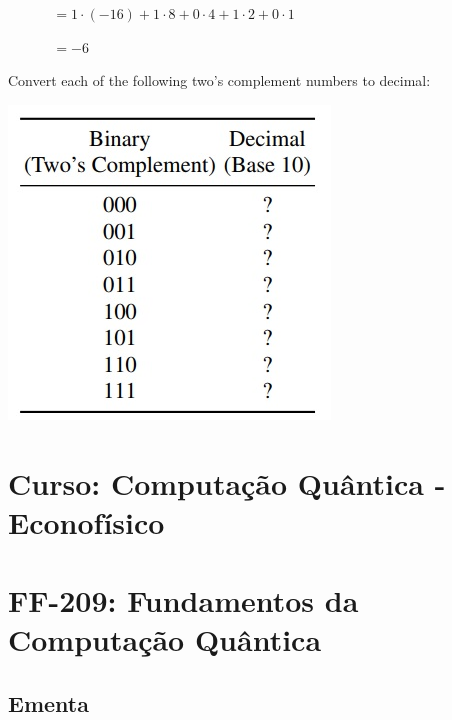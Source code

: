 \documentclass[12pt]{article}
\begin{document}
\(\quad\quad\quad\,= 1 \cdot (-16) + 1 \cdot 8 + 0 \cdot 4 + 1 \cdot 2 + 0 \cdot 1\)

\(\quad\quad\quad\,= - 6 \)

Convert each of the following two’s complement numbers to decimal:

\begin{center}
	\includegraphics[width=0.5\linewidth]{figuras/exe_1-8}
\end{center}


\newpage
\section{Curso: Computação Quântica - Econofísico}
\newpage
\section{FF-209: Fundamentos da Computação Quântica}

\subsection{Ementa}
\end{document}
